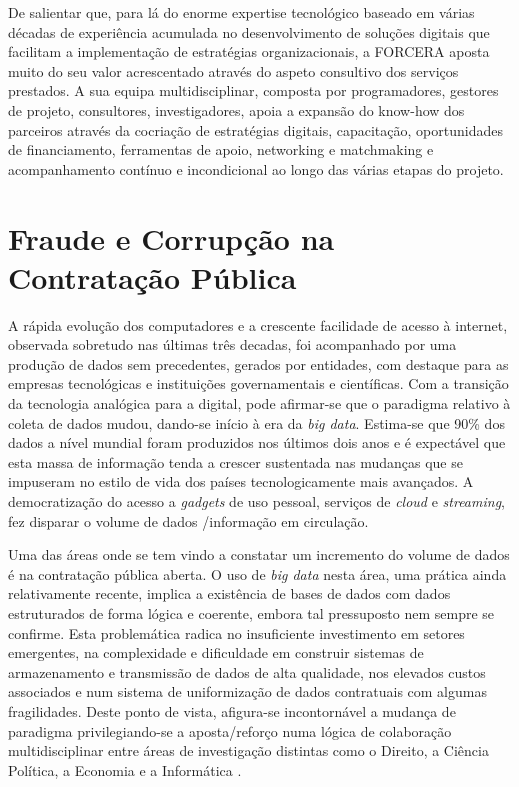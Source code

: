 De salientar que, para lá do enorme expertise tecnológico baseado em várias décadas de experiência acumulada no desenvolvimento de soluções digitais que facilitam a implementação de estratégias organizacionais, a FORCERA aposta muito do seu valor acrescentado através do aspeto consultivo dos serviços prestados. A sua equipa multidisciplinar, composta por programadores, gestores de projeto, consultores, investigadores, apoia a expansão do know-how dos parceiros através da cocriação de estratégias digitais, capacitação, oportunidades de financiamento, ferramentas de apoio, networking e matchmaking e acompanhamento contínuo e incondicional ao longo das várias etapas do projeto.



\section{Fraude e Corrupção na Contratação Pública}

A rápida evolução dos computadores e a crescente facilidade de acesso à internet, observada sobretudo nas últimas três decadas, foi acompanhado por uma produção de dados sem precedentes, gerados por entidades, com destaque para as empresas tecnológicas e instituições governamentais e científicas. Com a transição da tecnologia analógica para a digital, pode afirmar-se que o paradigma relativo à coleta de dados mudou, dando-se início à era da \textit{big data}. Estima-se que 90\% dos dados a nível mundial foram produzidos nos últimos dois anos e é expectável que esta massa de informação tenda a crescer sustentada nas mudanças que se impuseram no estilo de vida dos países tecnologicamente mais avançados. A democratização do acesso a \textit{gadgets} de uso pessoal, serviços de \textit{cloud} e \textit{streaming}, fez disparar o volume de dados /informação em circulação.


Uma das áreas onde se tem vindo a constatar um incremento do volume de dados é na contratação pública aberta. O uso de \textit{big data} nesta área, uma prática ainda relativamente recente, implica a existência de bases de dados com dados estruturados de forma lógica e coerente, embora tal pressuposto nem sempre se confirme. Esta problemática radica no insuficiente investimento em setores emergentes, na complexidade e dificuldade em construir sistemas de armazenamento e transmissão de dados de alta qualidade, nos elevados custos associados e num sistema de uniformização de dados contratuais com algumas fragilidades. Deste ponto de vista, afigura-se incontornável a mudança de paradigma privilegiando-se a aposta/reforço numa lógica de colaboração multidisciplinar entre áreas de investigação distintas como o Direito, a Ciência Política, a Economia e a Informática\cite{inbook} \cite{ocp_brief}.



